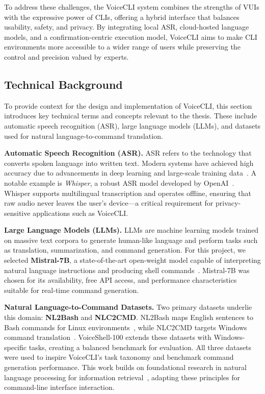 \documentclass[a4paper,12pt]{article}
\begin{document}
To address these challenges, the VoiceCLI system combines the strengths of VUIs with the expressive power of CLIs, offering a hybrid interface that balances usability, safety, and privacy. By integrating local ASR, cloud-hosted language models, and a confirmation-centric execution model, VoiceCLI aims to make CLI environments more accessible to a wider range of users while preserving the control and precision valued by experts.

\subsection{Technical Background}
To provide context for the design and implementation of VoiceCLI, this section introduces key technical terms and concepts relevant to the thesis. These include automatic speech recognition (ASR), large language models (LLMs), and datasets used for natural language-to-command translation.

\textbf{Automatic Speech Recognition (ASR).} ASR refers to the technology that converts spoken language into written text. Modern systems have achieved high accuracy due to advancements in deep learning and large-scale training data~\cite{ref5}. A notable example is \textit{Whisper}, a robust ASR model developed by OpenAI~\cite{ref10}. Whisper supports multilingual transcription and operates offline, ensuring that raw audio never leaves the user's device—a critical requirement for privacy-sensitive applications such as VoiceCLI.

\textbf{Large Language Models (LLMs).} LLMs are machine learning models trained on massive text corpora to generate human-like language and perform tasks such as translation, summarization, and command generation. For this project, we selected \textbf{Mistral-7B}, a state-of-the-art open-weight model capable of interpreting natural language instructions and producing shell commands~\cite{ref11}. Mistral-7B was chosen for its availability, free API access, and performance characteristics suitable for real-time command generation.



\textbf{Natural Language-to-Command Datasets.} Two primary datasets underlie this domain: \textbf{NL2Bash} and \textbf{NLC2CMD}. NL2Bash maps English sentences to Bash commands for Linux environments~\cite{ref26}, while NLC2CMD targets Windows command translation~\cite{ref27}. VoiceShell-100 extends these datasets with Windows-specific tasks, creating a balanced benchmark for evaluation. All three datasets were used to inspire VoiceCLI's task taxonomy and benchmark command generation performance. This work builds on foundational research in natural language processing for information retrieval~\cite{ref14}, adapting these principles for command-line interface interaction.
\end{document}
